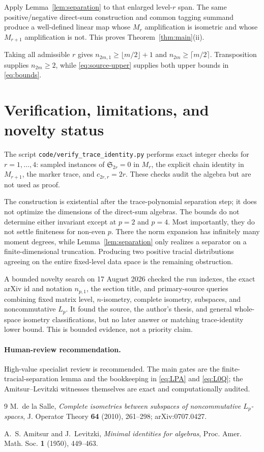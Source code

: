 \documentclass[11pt]{article}
\theoremstyle{remark}
\newcommand{\Spol}{\mathfrak S}
\begin{document}
Apply Lemma~\ref{lem:separation} to that enlarged level-$r$ span.  The same
positive/negative direct-sum construction and common tagging summand produce
a well-defined linear map whose $M_r$ amplification is isometric and whose
$M_{r+1}$ amplification is not.  This proves Theorem~\ref{thm:main}(ii).

Taking all admissible $r$ gives
$n_{2m,1}\ge\lfloor m/2\rfloor+1$ and
$n_{2m}\ge\lceil m/2\rceil$.  Transposition supplies
$n_{2m}\ge2$, while \eqref{eq:source-upper} supplies both upper bounds in
\eqref{eq:bounds}.

\section{Verification, limitations, and novelty status}

The script \texttt{code/verify\_trace\_identity.py} performs exact integer
checks for $r=1,\ldots,4$: sampled instances of
$\Spol_{2r}=0$ in $M_r$, the explicit chain identity in $M_{r+1}$, the
marker trace, and $c_{2r,r}=2r$.  These checks audit the algebra but are not
used as proof.

The construction is existential after the trace-polynomial separation step;
it does not optimize the dimensions of the direct-sum algebras.  The bounds
do not determine either invariant except at $p=2$ and $p=4$.  Most
importantly, they do not settle finiteness for non-even $p$.  There the norm
expansion has infinitely many moment degrees, while Lemma~\ref{lem:separation}
only realizes a separator on a finite-dimensional truncation.  Producing two
positive tracial distributions agreeing on the entire fixed-level data space
is the remaining obstruction.

A bounded novelty search on 17 August 2026 checked the run indexes, the exact
arXiv id and notation $n_{p,1}$, the section title, and primary-source queries
combining fixed matrix level, $n$-isometry, complete isometry, subspaces, and
noncommutative $L_p$.  It found the source, the author's thesis, and general
whole-space isometry classifications, but no later answer or matching
trace-identity lower bound.  This is bounded evidence, not a priority claim.

\paragraph{Human-review recommendation.}
High-value specialist review is recommended.  The main gates are the
finite-tracial-separation lemma and the bookkeeping in
\eqref{eq:LPA} and \eqref{eq:L0Q}; the Amitsur--Levitzki witnesses themselves
are exact and computationally audited.

\begin{thebibliography}{9}
M.~de la Salle,
\emph{Complete isometries between subspaces of noncommutative $L_p$-spaces},
J. Operator Theory \textbf{64} (2010), 261--298;
arXiv:0707.0427.

A.~S. Amitsur and J.~Levitzki,
\emph{Minimal identities for algebras},
Proc. Amer. Math. Soc. \textbf{1} (1950), 449--463.
\end{thebibliography}
\end{document}

